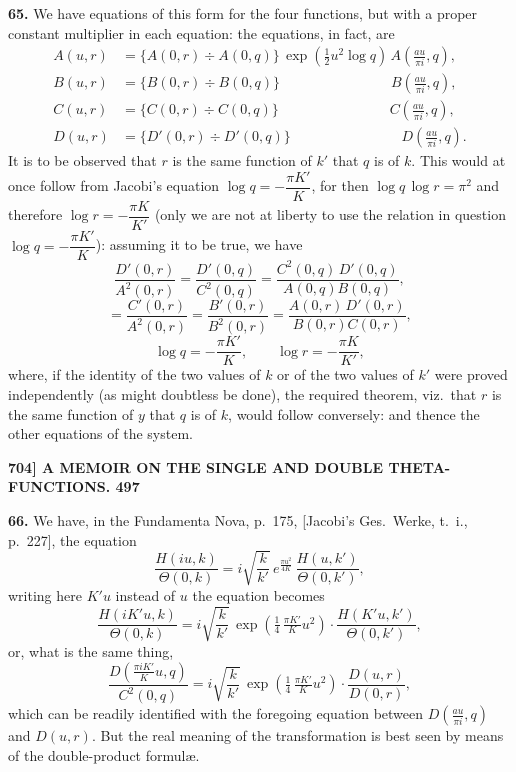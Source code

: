 \documentclass[11pt]{article}
\begin{document}
\medskip
\textbf{65.} We have equations of this form for the four functions, but with a proper constant multiplier in each equation: the equations, in fact, are
\[
\begin{aligned}
A(u,r) &= \{A(0,r) \div A(0,q)\}\,\exp(\tfrac{1}{2}u^2\log q)\,A\!\left(\tfrac{au}{\pi i},q\right),\\
B(u,r) &= \{B(0,r) \div B(0,q)\}\,\phantom{\exp(\tfrac{1}{2}u^2\log q)\,}B\!\left(\tfrac{au}{\pi i},q\right),\\
C(u,r) &= \{C(0,r) \div C(0,q)\}\,\phantom{\exp(\tfrac{1}{2}u^2\log q)\,}C\!\left(\tfrac{au}{\pi i},q\right),\\
D(u,r) &= \{D'(0,r) \div D'(0,q)\}\,\phantom{\exp(\tfrac{1}{2}u^2\log q)\,}D\!\left(\tfrac{au}{\pi i},q\right).
\end{aligned}
\]
It is to be observed that $r$ is the same function of $k'$ that $q$ is of $k$. This would at once follow from Jacobi's equation $\log q = -\dfrac{\pi K'}{K}$, for then $\log q\,\log r = \pi^2$ and therefore $\log r = -\dfrac{\pi K}{K'}$ (only we are not at liberty to use the relation in question $\log q = -\dfrac{\pi K'}{K}$): assuming it to be true, we have
\[
\frac{D'(0,r)}{A^2(0,r)} = \frac{D'(0,q)}{C^2(0,q)} = \frac{C^2(0,q)\,D'(0,q)}{A(0,q)B(0,q)},
\]
\[
= \frac{C'(0,r)}{A^2(0,r)} = \frac{B'(0,r)}{B^2(0,r)} = \frac{A(0,r)\,D'(0,r)}{B(0,r)C(0,r)},
\]
\[
\log q = -\frac{\pi K'}{K},\qquad \log r = -\frac{\pi K}{K'},
\]
where, if the identity of the two values of $k$ or of the two values of $k'$ were proved independently (as might doubtless be done), the required theorem, viz.\ that $r$ is the same function of $y$ that $q$ is of $k$, would follow conversely: and thence the other equations of the system.

\bigskip
\noindent\textbf{704] \hfill A MEMOIR ON THE SINGLE AND DOUBLE THETA-FUNCTIONS. \hfill 497}

\medskip
\textbf{66.} We have, in the Fundamenta Nova, p.~175, [Jacobi's Ges.~Werke, t.~i., p.~227], the equation
\[
\frac{H(iu,k)}{\Theta(0,k)} = i\sqrt{\frac{k}{k'}}\,e^{\frac{\pi u^2}{4K}}\,\frac{H(u,k')}{\Theta(0,k')},
\]
writing here $K'u$ instead of $u$ the equation becomes
\[
\frac{H(iK'u,k)}{\Theta(0,k)} = i\sqrt{\frac{k}{k'}}\,\exp\!\left(\tfrac{1}{4}\,\tfrac{\pi K'}{K}u^2\right)\!\cdot\frac{H(K'u,k')}{\Theta(0,k')},
\]
or, what is the same thing,
\[
\frac{D\!\left(\tfrac{\pi i K'}{K}u, q\right)}{C^2(0,q)} = i\sqrt{\frac{k}{k'}}\,\exp\!\left(\tfrac{1}{4}\,\tfrac{\pi K'}{K}u^2\right)\!\cdot\frac{D(u,r)}{D(0,r)},
\]
which can be readily identified with the foregoing equation between $D\!\left(\tfrac{au}{\pi i},q\right)$ and $D(u,r)$. But the real meaning of the transformation is best seen by means of the double-product formul\ae.
\end{document}
